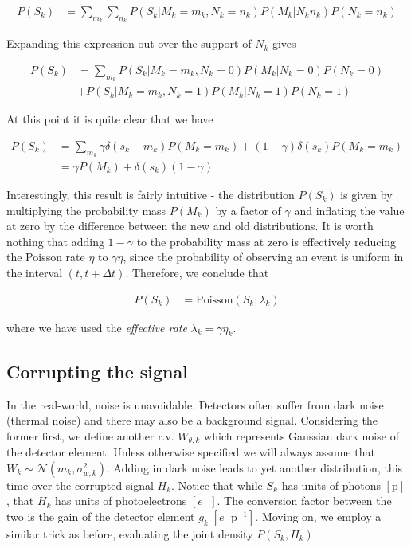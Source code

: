 \documentclass{article}
\begin{document}
\begin{align*}
P(S_{k})  &= \sum_{m_{k}}\sum_{n_{k}} P(S_{k}|M_{k}=m_{k},N_{k}=n_{k})P(M_{k}|N_{k}n_{k})P(N_{k}=n_{k})
\end{align*}

Expanding this expression out over the support of $N_{k}$ gives

\begin{align*}
P(S_{k}) &= \sum_{m_{k}}P(S_{k}|M_{k}=m_{k},N_{k}=0)P(M_{k}|N_{k}=0)P(N_{k}=0)\\
&+ P(S_{k}|M_{k}=m_{k},N_{k}=1)P(M_{k}|N_{k}=1)P(N_{k}=1)
\end{align*}

At this point it is quite clear that we have

\begin{align*}
P(S_{k}) &= \sum_{m_{k}}\gamma\delta(s_{k}-m_{k})P(M_{k}=m_{k})+(1-\gamma)\delta(s_{k}) P(M_{k}=m_{k})\\
&= \gamma P(M_{k}) + \delta(s_{k})(1-\gamma)
\end{align*}

Interestingly, this result is fairly intuitive - the distribution $P(S_{k})$ is given by multiplying the probability mass $P(M_{k})$ by a factor of $\gamma$ and inflating the value at zero by the difference between the new and old distributions. It is worth nothing that adding $1-\gamma$ to the probability mass at zero is effectively reducing the Poisson rate $\eta$ to $\gamma\eta$, since the probability of observing an event is uniform in the interval $(t, t+\Delta t)$. Therefore, we conclude that

\begin{align*}
P(S_{k}) &= \mathrm{Poisson}(S_{k}; \lambda_{k})
\end{align*}

where we have used the \emph{effective rate} $\lambda_{k} = \gamma\eta_{k}$. 

\subsection{Corrupting the signal}

In the real-world, noise is unavoidable. Detectors often suffer from dark noise (thermal noise) and there may also be a background signal. Considering the former first, we define another r.v. $W_{\theta,k}$ which represents Gaussian dark noise of the detector element. Unless otherwise specified we will always assume that $W_{k} \sim \mathcal{N}(m_{k},\sigma_{w,k}^{2})$. Adding in dark noise leads to yet another distribution, this time over the corrupted signal $H_{k}$. Notice that while $S_{k}$ has units of photons $[\mathrm{p}]$, that $H_{k}$ has units of photoelectrons $[e^{-}]$. The conversion factor between the two is the gain of the detector element $g_{k}\; [e^{-}\mathrm{p}^{-1}]$. Moving on, we employ a similar trick as before, evaluating the joint density $P(S_{k},H_{k})$
\end{document}
